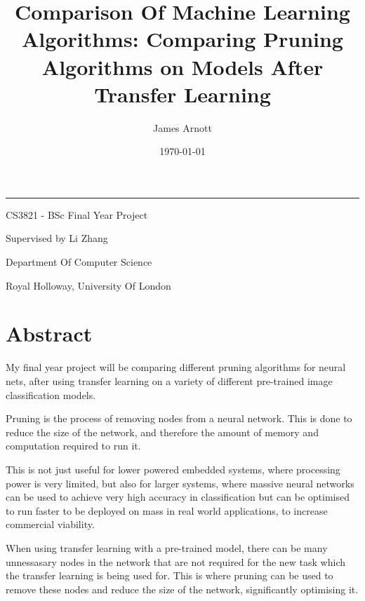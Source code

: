 \documentclass{article}
\title{\titleFont Comparison Of Machine Learning Algorithms: Comparing Pruning Algorithms on Models After Transfer Learning}
\date{\Large \today}
\author{\subtitleFont James Arnott}
\begin{document}
\maketitle

\begin {center}
\noindent\rule{15cm}{0.4pt}
\end{center}

\vspace{1cm}

\begin{center}
	\begin{Large}
			CS3821 - BSc Final Year Project

			\vspace{0.6cm}

			Supervised by Li Zhang

			\vspace{0.6cm}

			Department Of Computer Science

			\vspace{0.2cm}

			Royal Holloway, University Of London
	\end{Large}
\end{center}


\pagebreak

\section{Abstract}
My final year project will be comparing different pruning algorithms for neural nets,
after using transfer learning on a variety of different pre-trained image classification models.

Pruning is the process of removing nodes from a neural network.
This is done to reduce the size of the network, and therefore the amount of memory and
computation required to run it.

This is not just useful for lower powered embedded systems,
where processing power is very limited, but also for larger systems,
where massive neural networks can be used to achieve very
high accuracy in classification but can be optimised to run faster
to be deployed on mass in real world applications, to increase
commercial viability.

When using transfer learning with a pre-trained model, there can be many
unnessasary nodes in the network that are not required for the new task
which the transfer learning is being used for. This is where pruning can be used
to remove these nodes and reduce the size of the network, significantly optimising it.
\end{document}
